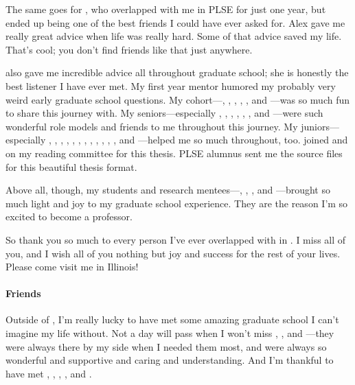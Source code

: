 The same goes for , who overlapped with me in PLSE for just one year,
but ended up being one of the best friends I could have ever asked for.
Alex gave me really great advice when life was really hard.
Some of that advice saved my life.
That's cool; you don't find friends like that just anywhere.

 also gave me incredible advice all throughout graduate school; she is honestly the best listener I have ever met.
My first year mentor  humored my probably very weird early graduate school questions.
My cohort---, , , , 
, and ---was so much fun to share this journey with.
My seniors---especially , , , , , 
, and ---were such wonderful role models and friends to me throughout this journey.
My juniors---especially , , ,
, %
, %
, %
, %
, %
, %
,
,
,
and ---helped me so much throughout, too.
 joined  and  on my reading committee for this thesis.
PLSE alumnus  sent me the source files for this beautiful thesis format.

Above all, though, my students and research mentees---, , , and ---brought
so much light and joy to my graduate school experience.
They are the reason I'm so excited to become a professor.

So thank you so much to every person I've ever overlapped with in .
I miss all of you, and I wish all of you nothing but joy and success for the rest of your lives.
Please come visit me in Illinois!

\paragraph{Friends}
Outside of , I'm really lucky to have met some amazing graduate school  I can't imagine my life without.
Not a day will pass when I won't miss , , and ---they were always
there by my side when I needed them most,
and were always so wonderful and supportive and caring and understanding.
And I'm thankful to have met , ,
, , and .

